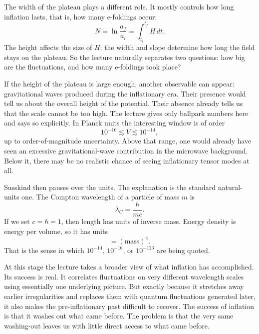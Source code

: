 The width of the plateau plays a different role. It mostly controls how long inflation lasts, that is, how many e-foldings occur:
\begin{equation}
N=\ln\!\frac{a_f}{a_i}=\int_{t_i}^{t_f} H\,dt.
\end{equation}
The height affects the size of \(H\); the width and slope determine how long the field stays on the plateau. So the lecture naturally separates two questions: how big are the fluctuations, and how many e-foldings took place?

If the height of the plateau is large enough, another observable can appear: gravitational waves produced during the inflationary era. Their presence would tell us about the overall height of the potential. Their absence already tells us that the scale cannot be too high. The lecture gives only ballpark numbers here and says so explicitly. In Planck units the interesting window is of order
\begin{equation}
10^{-16}\lesssim V \lesssim 10^{-14},
\end{equation}
up to order-of-magnitude uncertainty. Above that range, one would already have seen an excessive gravitational-wave contribution in the microwave background. Below it, there may be no realistic chance of seeing inflationary tensor modes at all.

Susskind then pauses over the units. The explanation is the standard natural-units one. The Compton wavelength of a particle of mass \(m\) is
\begin{equation}
\lambda_C=\frac{\hbar}{mc}.
\end{equation}
If we set \(c=\hbar=1\), then length has units of inverse mass. Energy density is energy per volume, so it has units
\begin{equation}
[\rho]=(\text{mass})^4.
\end{equation}
That is the sense in which \(10^{-14}\), \(10^{-16}\), or \(10^{-123}\) are being quoted.

At this stage the lecture takes a broader view of what inflation has accomplished. Its success is real. It correlates fluctuations on very different wavelength scales using essentially one underlying picture. But exactly because it stretches away earlier irregularities and replaces them with quantum fluctuations generated later, it also makes the pre-inflationary past difficult to recover. The success of inflation is that it washes out what came before. The problem is that the very same washing-out leaves us with little direct access to what came before.

